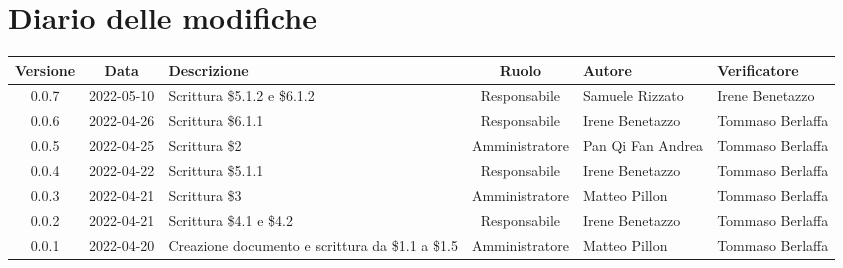 \section*{Diario delle modifiche}
	\begin{center}
	\renewcommand{\arraystretch}{1.8} %
	\begin{tabular}{ |c|c|p{8em}|c|m{5em}|m{5em}| }
	\hline
	\textbf{Versione} & \textbf{Data} & \textbf{Descrizione} &  \textbf{Ruolo} &  \textbf{Autore} & \textbf{Verificatore}\\ %
	\hline %
	0.0.7 & 2022-05-10 & Scrittura \$5.1.2 e \$6.1.2 & Responsabile & Samuele \newline Rizzato & Irene \newline Benetazzo \\
	\hline
	0.0.6 & 2022-04-26 & Scrittura \$6.1.1 & Responsabile & Irene \newline Benetazzo & Tommaso \newline Berlaffa\\
	\hline 
	0.0.5& 2022-04-25 & Scrittura \$2 & Amministratore & Pan Qi Fan \newline Andrea & Tommaso \newline Berlaffa\\
	\hline
	0.0.4 & 2022-04-22 & Scrittura \$5.1.1 & Responsabile & Irene \newline Benetazzo & Tommaso \newline Berlaffa\\
	\hline 
	0.0.3 & 2022-04-21 & Scrittura \$3 & Amministratore & Matteo \newline Pillon & Tommaso \newline Berlaffa\\
	\hline
	0.0.2 & 2022-04-21 & Scrittura \newline \$4.1 e \$4.2 & Responsabile & Irene \newline Benetazzo & Tommaso \newline Berlaffa\\
	\hline
    0.0.1 & 2022-04-20 & Creazione documento e scrittura \newline da \$1.1 a \$1.5 & Amministratore & Matteo \newline Pillon & Tommaso \newline Berlaffa \\ 
	\hline
	\end{tabular}
	\end{center}
	\newpage
